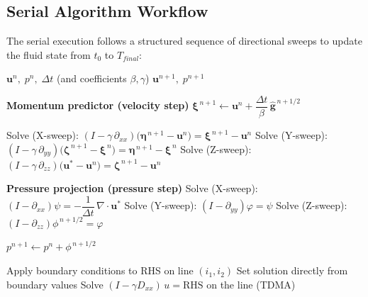\documentclass[12pt]{article}
\begin{document}
\subsection{Serial Algorithm Workflow}
The serial execution follows a structured sequence of directional sweeps to update the fluid state from $t_0$ to $T_{final}$:
\begin{algorithm}[H]
\caption{Fractional-Step Scheme with Directional Splitting (key stages)}
\label{alg:split_scheme}
\begin{algorithmic}[1]
\Require $\mathbf{u}^n,\; p^n,\; \Delta t$ (and coefficients $\beta,\gamma$)
\Ensure $\mathbf{u}^{n+1},\; p^{n+1}$


    \Statex \textbf{Momentum predictor (velocity step)}
    \State $\boldsymbol{\xi}^{\,n+1} \gets \mathbf{u}^n + \dfrac{\Delta t}{\beta}\,\hat{\mathbf{g}}^{\,n+1/2}$ 

    \State Solve (X-sweep): \quad $(I-\gamma\,\partial_{xx})\big(\boldsymbol{\eta}^{\,n+1}-\mathbf{u}^n\big)=\boldsymbol{\xi}^{\,n+1}-\mathbf{u}^n$
    \State Solve (Y-sweep): \quad $(I-\gamma\,\partial_{yy})\big(\boldsymbol{\zeta}^{\,n+1}-\boldsymbol{\xi}^{\,n}\big)=\boldsymbol{\eta}^{\,n+1}-\boldsymbol{\xi}^{\,n}$
    \State Solve (Z-sweep): \quad $(I-\gamma\,\partial_{zz})\big(\mathbf{u}^{*}-\mathbf{u}^{n}\big)=\boldsymbol{\zeta}^{\,n+1}-\mathbf{u}^{n}$

    \Statex \textbf{Pressure projection (pressure step)}
    \State Solve (X-sweep): \quad $(I-\partial_{xx})\psi = -\dfrac{1}{\Delta t}\,\nabla\cdot \mathbf{u}^{*}$
    \State Solve (Y-sweep): \quad $(I-\partial_{yy})\varphi = \psi$
    \State Solve (Z-sweep): \quad $(I-\partial_{zz})\phi^{\,n+1/2} = \varphi$

    \State $p^{n+1} \gets p^{n} + \phi^{\,n+1/2}$ 


\EndFor
\end{algorithmic}
\end{algorithm}

\begin{algorithm}[H]
\caption{Direction Splitting (single sweep)}
\label{alg:direction_splitting}
\begin{algorithmic}[1]
    \State Apply boundary conditions to RHS on line $(i_1,i_2)$
      \State Set solution directly from boundary values
    \Else
      \State Solve $(I - \gamma D_{xx})\,u = \text{RHS}$ on the line (TDMA)
    \EndIf
  \EndFor
\EndFor
\end{algorithmic}
\end{algorithm}
\end{document}
